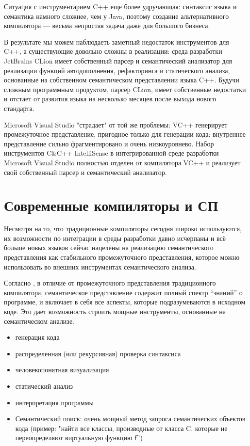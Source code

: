 Ситуация с инструментарием C++ еще более удручающая: синтаксис языка
и семантика намного сложнее, чем у Java, поэтому создание альтернативного
компилятора --- весьма непростая задача даже для большого бизнеса.

В результате мы можем наблюдаеть заметный недостаток инструментов для C++\cite{Zouev2010}, а существующие
довольно сложны в реализации: среда разработки JetBrains CLion имеет собственный парсер
и семантический анализатор для реализации функций автодополнения, рефакторинга и статического анализа,
основанные на собственном семантическом представлении языка C++. 
Будучи сложным программным продуктом, парсер CLion, имеет собственные недостатки и 
отстает от развития языка на несколько месяцев после выхода нового стандарта.


Microsoft Visual Studio "страдает" от той же проблемы: VC++ генерирует промежуточное представление, пригодное
только для генерации кода: внутреннее представление сильно фрагментировано и очень низкоуровнево.
Набор инструментов C\&C++ IntelliSense в интегрированной среде разработки Microsoft Visual Studio 
полностью отделен от компилятора VC++ и реализует свой собственный парсер и семантический анализатор.

\section{Современные компиляторы и СП}
\label{sec:review_2}

Несмотря на то, что традиционные компиляторы сегодня широко используются, их
возможности по интеграции в среды разработки давно исчерпаны и всё больше новых языков сейчас
нацелены на реализацию семантического представления как стабильного промежуточного представления,
которое можно использовать во внешних инструментах семантического анализа.

Согласно \cite{Zouev2005, Zouev2010}, в отличие от промежуточного представления традиционного компилятора, 
семантическое представление содержит полный спектр ``знаний'' о программе, и включает в себя все аспекты, которые подразумеваются 
в исходном коде. Это дает возможность строить мощные инструменты, основанные на семантическом анализе.

\begin{itemize}
\item генерация кода
\item распределенная (или рекурсивная) проверка синтаксиса
\item человекопонятная визуализация
\item статический анализ
\item интерпретация программы
\item Семантический поиск: очень мощный метод запроса семантических объектов кода (пример: "найти все классы, производные от класса C, которые не переопределяют виртуальную функцию f”)
\end{itemize}

